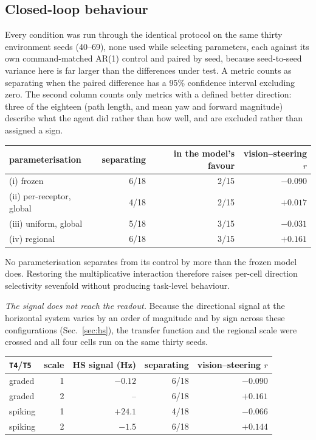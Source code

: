 \documentclass[10pt,twoside]{article}
\newcommand{\cell}[1]{\texttt{#1}}
\begin{document}
\subsection{Closed-loop behaviour}
\label{sec:behaviour}

Every condition was run through the identical protocol on the same thirty
environment seeds (40--69), none used while selecting parameters, each against
its own command-matched AR(1) control and paired by seed, because seed-to-seed
variance here is far larger than the differences under test. A metric counts
as separating when the paired difference has a 95\% confidence interval
excluding zero. The second column counts only metrics with a defined better
direction: three of the eighteen (path length, and mean yaw and forward
magnitude) describe what the agent did rather than how well, and are excluded
rather than assigned a sign.

\begin{center}
\small
\begin{tabular}{lrrr}
\toprule
parameterisation & separating & in the model's favour & vision--steering $r$\\
\midrule
(i) frozen                 & 6/18 & 2/15 & $-0.090$\\
(ii) per-receptor, global  & 4/18 & 2/15 & $+0.017$\\
(iii) uniform, global      & 5/18 & 3/15 & $-0.031$\\
(iv) regional              & 6/18 & 3/15 & $+0.161$\\
\bottomrule
\end{tabular}
\end{center}

No parameterisation separates from its control by more than the frozen model
does. Restoring the multiplicative interaction therefore raises per-cell
direction selectivity sevenfold without producing task-level behaviour.

\emph{The signal does not reach the readout.} Because the directional signal
at the horizontal system varies by an order of magnitude and by sign across
these configurations (Sec.~\ref{sec:hs}), the transfer function and the
regional scale were crossed and all four cells run on the same thirty seeds.

\begin{center}
\small
\begin{tabular}{lrrrr}
\toprule
\cell{T4}/\cell{T5} & scale & HS signal (Hz) & separating & vision--steering $r$\\
\midrule
graded  & 1 & $-0.12$ & 6/18 & $-0.090$\\
graded  & 2 & --      & 6/18 & $+0.161$\\
spiking & 1 & $\mathbf{+24.1}$ & 4/18 & $-0.066$\\
spiking & 2 & $\mathbf{-1.5}$  & 6/18 & $+0.144$\\
\bottomrule
\end{tabular}
\end{center}
\end{document}
